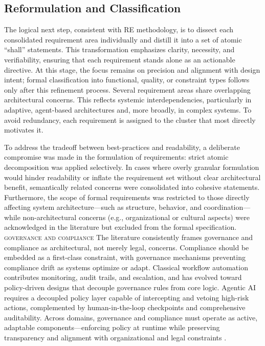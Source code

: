 \subsection{Reformulation and Classification}\label{subsec:req-clas}
The logical next step, consistent with RE methodology, is to dissect each consolidated requirement area individually and distill it into a set of atomic “shall” statements. This transformation emphasizes clarity, necessity, and verifiability, ensuring that each requirement stands alone as an actionable directive. At this stage, the focus remains on precision and alignment with design intent; formal classification into functional, quality, or constraint types follows only after this refinement process. Several requirement areas share overlapping architectural concerns. This reflects systemic interdependencies, particularly in adaptive, agent-based architectures and, more broadly, in complex systems. To avoid redundancy, each requirement is assigned to the cluster that most directly motivates it.

To address the tradeoff between best-practices and readability, a deliberate compromise was made in the formulation of requirements: strict atomic decomposition was applied selectively. In cases where overly granular formulation would hinder readability or inflate the requirement set without clear architectural benefit, semantically related concerns were consolidated into cohesive statements. Furthermore, the scope of formal requirements was restricted to those directly affecting system architecture—such as structure, behavior, and coordination—while non-architectural concerns (e.g., organizational or cultural aspects) were acknowledged in the literature but excluded from the formal specification. \\

\noindent \textsc{governance and compliance} \quad The literature consistently frames governance and compliance as architectural, not merely legal, concerns. Compliance should be embedded as a first-class constraint, with governance mechanisms preventing compliance drift as systems optimize or adapt. Classical workflow automation contributes monitoring, audit trails, and escalation, and has evolved toward policy-driven designs that decouple governance rules from core logic. %
Agentic AI requires a decoupled policy layer capable of intercepting and vetoing high-risk actions, complemented by human-in-the-loop checkpoints and comprehensive auditability. Across domains, governance and compliance must operate as active, adaptable components—enforcing policy at runtime while preserving transparency and alignment with organizational and legal constraints \parencite{basuResearch2002, gauravGovernance2025}.

